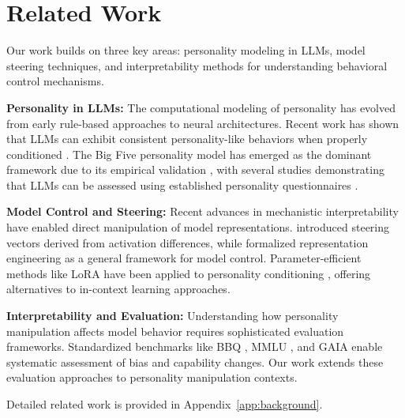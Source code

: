 \section{Related Work}

Our work builds on three key areas: personality modeling in LLMs, model steering techniques, and interpretability methods for understanding behavioral control mechanisms.

\textbf{Personality in LLMs:} The computational modeling of personality has evolved from early rule-based approaches \citep{mairesse-walker-2007-personage} to neural architectures. Recent work has shown that LLMs can exhibit consistent personality-like behaviors when properly conditioned \citep{jiang-etal-2023-personallm, huang-etal-2023-chatgpt-personality}. The Big Five personality model has emerged as the dominant framework due to its empirical validation \citep{costa-mccrae-1992-big5}, with several studies demonstrating that LLMs can be assessed using established personality questionnaires \citep{serapio-garcia-etal-2023-personality-traits-llms}.

\textbf{Model Control and Steering:} Recent advances in mechanistic interpretability have enabled direct manipulation of model representations. \citet{turner-etal-2023-activation-steering} introduced steering vectors derived from activation differences, while \citet{li-etal-2023-representation-engineering} formalized representation engineering as a general framework for model control. Parameter-efficient methods like LoRA \citep{hu-etal-2022-lora} have been applied to personality conditioning \citep{zhang-etal-2023-peft-personality}, offering alternatives to in-context learning approaches.

\textbf{Interpretability and Evaluation:} Understanding how personality manipulation affects model behavior requires sophisticated evaluation frameworks. Standardized benchmarks like BBQ \citep{parrish-etal-2022-bbq}, MMLU \citep{hendrycks-etal-2021-mmlu}, and GAIA \citep{mialon-etal-2023-gaia} enable systematic assessment of bias and capability changes. Our work extends these evaluation approaches to personality manipulation contexts.

\noindent Detailed related work is provided in Appendix~\ref{app:background}.